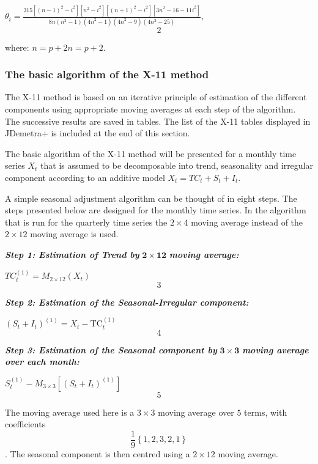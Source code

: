\documentclass[
]{book}
\begin{document}
\(\theta_{i} = \frac{315\left\lbrack \left( n - 1 \right)^{2} - i^{2} \right\rbrack\left\lbrack n^{2} - i^{2} \right\rbrack\left\lbrack \left( n + 1 \right)^{2} - i^{2} \right\rbrack\left\lbrack {3n}^{2} - 16 - 11i^{2} \right\rbrack}{8n\left( n^{2} - 1 \right)\left( {4n}^{2} - 1 \right)\left( {4n}^{2} - 9 \right)\left( 4n^{2} - 25 \right)}\), \[2\]

where: \(n = p + 2\)\(n = p + 2\).

\hypertarget{the-basic-algorithm-of-the-x-11-method}{%
\subsubsection{The basic algorithm of the X-11 method}\label{the-basic-algorithm-of-the-x-11-method}}

The X-11 method is based on an iterative principle of estimation of the
different components using appropriate moving averages at each step of
the algorithm. The successive results are saved in tables. The list of
the X-11 tables displayed in JDemetra+ is included at the end of this
section.

The basic algorithm of the X-11 method will be presented for a monthly
time series \(X_{t}\) that is assumed to be decomposable into trend,
seasonality and irregular component according to an additive model
\(X_{t} = TC_{t} + S_{t} + I_{t}\).

A simple seasonal adjustment algorithm can be thought of in eight steps.
The steps presented below are designed for the monthly time series. In
the algorithm that is run for the quarterly time series the \(2 \times 4\)
moving average instead of the \(2 \times 12\) moving average is used.

\textbf{\emph{Step 1: Estimation of Trend by}} \(\mathbf{2 \times 12}\) \textbf{\emph{moving
average:}}

\(TC_{t}^{(1)} = M_{2 \times 12}(X_{t})\) \[3\]

\textbf{\emph{Step 2: Estimation of the Seasonal-Irregular component:}}

\(\left( S_{t} + I_{t} \right)^{(1)} = X_{t} - \text{TC}_{t}^{(1)}\) \[4\]

\textbf{\emph{Step 3: Estimation of the Seasonal component by}} \(\mathbf{3 \times 3}\)
\textbf{\emph{moving average over each month:}}

\(S_{t}^{(1)} - M_{3 \times 3}\left\lbrack \left( S_{t} + I_{t} \right)^{(1)} \right\rbrack\) \[5\]

The moving average used here is a \(3 \times 3\) moving average over
\(5\) terms, with coefficients
\[\frac{1}{9} \left\{1, 2, 3, 2, 1 \right\}\]. The seasonal component
is then centred using a \(2 \times 12\) moving average.
\end{document}
